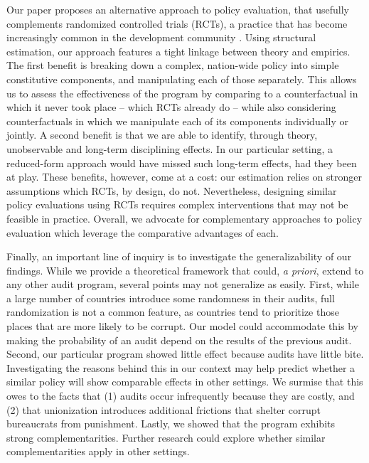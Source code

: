 \documentclass[12pt,a4paper]{article}
\theoremstyle{definition}
\begin{document}
{Our paper proposes an alternative approach to policy evaluation, that usefully complements randomized controlled trials (RCTs), a practice that has become increasingly common in the development community \citep{deaton2010instruments}. Using structural estimation, our approach features a tight linkage between theory and empirics. The first benefit is breaking down a complex, nation-wide policy into simple constitutive components, and manipulating each of those separately. This allows us to assess the effectiveness of the program by comparing to a counterfactual in which it never took place -- which RCTs already do -- while also considering counterfactuals in which we manipulate each of its components individually or jointly. A second benefit is that we are able to identify, through theory, unobservable and long-term disciplining effects. In our particular setting, a reduced-form approach would have missed such long-term effects, had they been at play. These benefits, however, come at a cost: our estimation relies on stronger assumptions which RCTs, by design, do not. Nevertheless, designing similar policy evaluations using RCTs requires complex interventions that may not be feasible in practice. Overall, we advocate for complementary approaches to policy evaluation which leverage the comparative advantages of each. 

Finally, an important line of inquiry is to investigate the generalizability of our findings. While we provide a theoretical framework that could, \emph{a priori}, extend to any other audit program, several points may not generalize as easily. First, while a large number of countries introduce some randomness in their audits, full randomization is not a common feature, as countries tend to prioritize those places that are more likely to be corrupt. Our model could accommodate this by making the probability of an audit depend on the results of the previous audit. Second, our particular program showed little effect because audits have little bite. Investigating the reasons behind this in our context may help predict whether a similar policy will show comparable effects in other settings. We surmise that this owes to the facts that (1) audits occur infrequently because they are costly, and (2) that unionization introduces additional frictions that shelter corrupt bureaucrats from punishment. Lastly, we showed that the program exhibits strong complementarities. Further research could explore whether similar complementarities apply in other settings. 

\newpage

}
\end{document}
